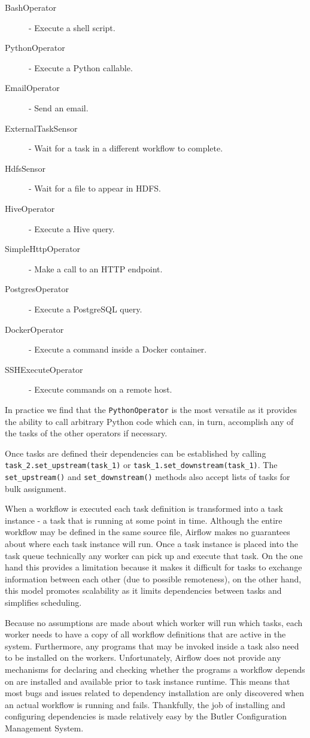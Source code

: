 \begin{description}
\item [BashOperator] - Execute a shell script.
\item [PythonOperator] - Execute a Python callable.
\item [EmailOperator] - Send an email.
\item [ExternalTaskSensor] - Wait for a task in a different workflow to complete.
\item [HdfsSensor] - Wait for a file to appear in HDFS.
\item [HiveOperator] - Execute a Hive query.
\item [SimpleHttpOperator] - Make a call to an HTTP endpoint.
\item [PostgresOperator] - Execute a PostgreSQL query.
\item [DockerOperator] - Execute a command inside a Docker container.
\item [SSHExecuteOperator] - Execute commands on a remote host.
\end{description}

In practice we find that the \texttt{PythonOperator} is the most versatile as it provides the ability to call arbitrary Python code which can, in turn, accomplish any of the tasks of the other operators if necessary.

Once tasks are defined their dependencies can be established by calling \texttt{task_2.set_upstream(task_1)} or \texttt{task_1.set_downstream(task_1)}. The \texttt{set_upstream()} and \texttt{set_downstream()} methods also accept lists of tasks for bulk assignment.

When a workflow is executed each task definition is transformed into a task instance - a task that is running at some point in time. Although the entire workflow may be defined in the same source file, Airflow makes no guarantees about where each task instance will run. Once a task instance is placed into the task queue technically any worker can pick up and execute that task. On the one hand this provides a limitation because it makes it difficult for tasks to exchange information between each other (due to possible remoteness), on the other hand, this model promotes scalability as it limits dependencies between tasks and simplifies scheduling.

Because no assumptions are made about which worker will run which tasks, each worker needs to have a copy of all workflow definitions that are active in the system. Furthermore, any programs that may be invoked inside a task also need to be installed on the workers. Unfortunately, Airflow does not provide any mechanisms for declaring and checking whether the programs a workflow depends on are installed and available prior to task instance runtime. This means that most bugs and issues related to dependency installation are only discovered when an actual workflow is running and fails. Thankfully, the job of installing and configuring dependencies is made relatively easy by the Butler Configuration Management System. 

